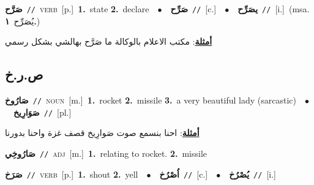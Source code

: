 \documentclass[10pt,a4paper,twoside]{article} %
\begin{document}
\begin{multicols}{2}
{\setlength\topsep{0pt}\textbf{\foreignlanguage{arabic}{صَرَّح}}\ {\color{gray}\texttt{//}\color{black}}\ \textsc{verb}\ [p.]\ \textbf{1.}~state  \textbf{2.}~declare\ \ $\bullet$\ \ \setlength\topsep{0pt}\textbf{\foreignlanguage{arabic}{صَرِّح}}\ {\color{gray}\texttt{//}\color{black}}\ [c.]\ \ $\bullet$\ \ \setlength\topsep{0pt}\textbf{\foreignlanguage{arabic}{يصَرِّح}}\ {\color{gray}\texttt{//}\color{black}}\ [i.]\ \color{gray}(msa. \foreignlanguage{arabic}{يُصَرِّح}~\foreignlanguage{arabic}{\textbf{١.}})\color{black}\  \begin{flushright}\color{gray}\foreignlanguage{arabic}{\textbf{\underline{\foreignlanguage{arabic}{أمثلة}}}: مكتب الاعلام بالوكالة ما صَرَّح بهالشي بشكل رسمي}\end{flushright}\color{black}} \vspace{2mm}

\vspace{-3mm}
\subsection*{\color{blue}\foreignlanguage{arabic}{ص.ر.خ}\color{blue}{}} 

{\setlength\topsep{0pt}\textbf{\foreignlanguage{arabic}{صَارُوخ}}\ {\color{gray}\texttt{//}\color{black}}\ \textsc{noun}\ [m.]\ \textbf{1.}~rocket  \textbf{2.}~missile  \textbf{3.}~a very beautiful lady (sarcastic)\ \ $\bullet$\ \ \setlength\topsep{0pt}\textbf{\foreignlanguage{arabic}{صَوَارِيخ}}\ {\color{gray}\texttt{//}\color{black}}\ [pl.]\  \begin{flushright}\color{gray}\foreignlanguage{arabic}{\textbf{\underline{\foreignlanguage{arabic}{أمثلة}}}: احنا بنسمع صوت صَوارِيخ قصف غزة واحنا بدورنا}\end{flushright}\color{black}} \vspace{2mm}

{\setlength\topsep{0pt}\textbf{\foreignlanguage{arabic}{صَارُوخِي}}\ {\color{gray}\texttt{//}\color{black}}\ \textsc{adj}\ [m.]\ \textbf{1.}~relating to rocket.  \textbf{2.}~missile\ } \vspace{2mm}

{\setlength\topsep{0pt}\textbf{\foreignlanguage{arabic}{صَرَخ}}\ {\color{gray}\texttt{//}\color{black}}\ \textsc{verb}\ [p.]\ \textbf{1.}~shout  \textbf{2.}~yell\ \ $\bullet$\ \ \setlength\topsep{0pt}\textbf{\foreignlanguage{arabic}{اُصْرُخ}}\ {\color{gray}\texttt{//}\color{black}}\ [c.]\ \ $\bullet$\ \ \setlength\topsep{0pt}\textbf{\foreignlanguage{arabic}{يُصْرُخ}}\ {\color{gray}\texttt{//}\color{black}}\ [i.]\ } \vspace{2mm}


\end{multicols}
\end{document}

